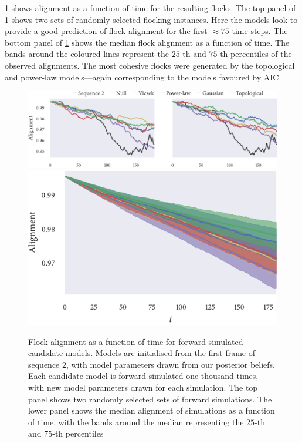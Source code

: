 \cref{fig:checks_seq2} shows alignment as a function of time for the resulting
flocks. The top panel of \cref{fig:checks_seq2} shows two sets of randomly
selected flocking instances. Here the models look to provide a good prediction 
of flock alignment for the first $\approx75$ time steps. The bottom panel of
\cref{fig:checks_seq2} shows the median flock alignment as a function of time.
The bands around the coloured lines represent the $25$-th and $75$-th
percentiles of the observed alignments. The most cohesive flocks were generated
by the topological and power-law models---again corresponding to the models
favoured by AIC.

\begin{figure}[tbp]
  \includegraphics{alignment/alignment_single_2.pdf}\vspace{1em}\\
  \includegraphics{alignment/alignment_ensemble_2.pdf}
  \caption{Flock alignment as a function of time for forward simulated
    candidate models. Models are initialised from the first frame of sequence
    $2$, with model parameters drawn from our posterior beliefs. Each candidate
    model is forward simulated one thousand times, with new model parameters
    drawn for each simulation. The top panel shows two randomly selected sets
    of forward simulations. The lower panel shows the median alignment of
    simulations as a function of time, with the bands around the median
    representing the $25$-th and $75$-th percentiles}
  \label{fig:checks_seq2}
\end{figure}

